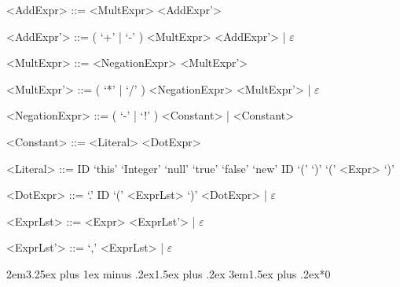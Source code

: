 \documentclass{report}
\begin{document}
\begin{grammar}
<AddExpr> ::= <MultExpr> <AddExpr'>

<AddExpr'> ::= ( `+' | `-' ) <MultExpr> <AddExpr'> | $\varepsilon$

<MultExpr> ::= <NegationExpr> <MultExpr'>

<MultExpr'> ::= ( `*' | `/' ) <NegationExpr> <MultExpr'> | $\varepsilon$

<NegationExpr> ::= ( `-' | `!' ) <Constant> | <Constant>

<Constant> ::= <Literal> <DotExpr>

<Literal> ::= ID
\alt `this'
\alt `Integer'
\alt `null'
\alt `true'
\alt `false'
\alt `new' ID `(' `)'
\alt `(' <Expr> `)'

<DotExpr> ::= `.' ID `(' <ExprLst> `)' <DotExpr> | $\varepsilon$

<ExprLst> ::= <Expr> <ExprLst'> | $\varepsilon$

<ExprLst'> ::= `,' <ExprLst> | $\varepsilon$

\end{grammar}


\titleformat{\subsection}[block]{}{\thesubsection}{1em}{}
\titleformat{\subsubsection}[block]{}{\thesubsubsection}{1em}{}
\titlespacing*{\subsection} {2em}{3.25ex plus 1ex minus .2ex}{1.5ex plus .2ex}
\titlespacing*{\subsubsection} {3em}{1.5ex plus .2ex}{*0}

\end{document}
